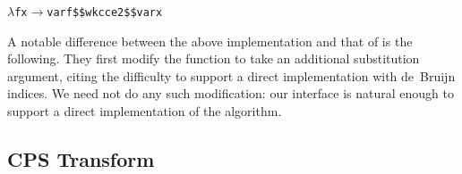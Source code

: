 \documentclass[9pt,authoryear]{sigplanconf}
\begin{document}
{{}\vphantom{$\{$}}\texttt{\mbox{\hspace{0.50em}}}\texttt{\mbox{\hspace{0.50em}}}\texttt{\mbox{\hspace{0.50em}}}\texttt{\mbox{\hspace{0.50em}}}\texttt{\mbox{\hspace{0.50em}}}\texttt{\mbox{\hspace{0.50em}}}\texttt{\mbox{\hspace{0.50em}}}\texttt{\mbox{\hspace{0.50em}}}\texttt{\mbox{\hspace{0.50em}}}\texttt{\mbox{\hspace{0.50em}}}\texttt{\makebox[1.22ex][l]{$ {(} $}}\texttt{$ \lambda $}\texttt{\mbox{\hspace{0.50em}}}\texttt{f}\texttt{\mbox{\hspace{0.50em}}}\texttt{x}\texttt{\mbox{\hspace{0.50em}}}\texttt{$ \rightarrow $}\texttt{\mbox{\hspace{0.50em}}}\texttt{var}\texttt{\mbox{\hspace{0.50em}}}\texttt{f}\texttt{\mbox{\hspace{0.50em}}}\texttt{\${}\${}}\texttt{\mbox{\hspace{0.50em}}}\texttt{wk}\texttt{\mbox{\hspace{0.50em}}}\texttt{\makebox[1.22ex][l]{$ {(} $}}\texttt{cc}\texttt{\mbox{\hspace{0.50em}}}\texttt{e2}\texttt{\makebox[1.22ex][r]{$ {)} $}}\texttt{\mbox{\hspace{0.50em}}}\texttt{\${}\${}}\texttt{\mbox{\hspace{0.50em}}}\texttt{var}\texttt{\mbox{\hspace{0.50em}}}\texttt{x}\texttt{\makebox[1.22ex][r]{$ {)} $}}\texttt{{\nopagebreak \newline%
}\vphantom{$\{$}}%


%
A notable difference between the above implementation and that of
    \citeauthor{guillemette_type-preserving_2007} is the following.
    They first modify the
    function to take an additional substitution argument, citing the
    difficulty to support a direct implementation with de{~}Bruijn
    indices. We need not do any such modification{:} our interface is
    natural enough to support a direct implementation of the algorithm.%


\subsection{CPS Transform\label{cpsSec}}
\end{document}
